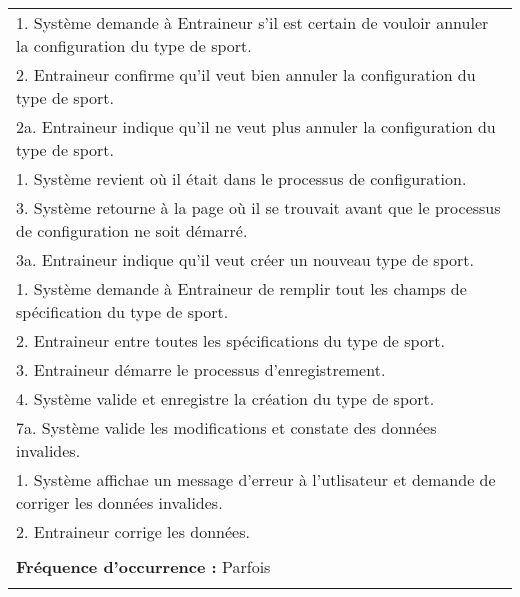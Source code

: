 \begin{tabular}{|p{16cm}|}
	\hspace{1cm}1. Système demande à Entraineur s'il est certain de vouloir annuler la configuration du type de sport.\\
	\hspace{1cm}2. Entraineur confirme qu'il veut bien annuler la configuration du type de sport.\\
	\hspace{2cm}2a. Entraineur indique qu'il ne veut plus annuler la configuration du type de sport.\\
	\hspace{3cm}1. Système revient où il était dans le processus de configuration.\\
	\hspace{1cm}3. Système retourne à la page où il se trouvait avant que le processus de configuration ne soit démarré.\\
	3a. Entraineur indique qu'il veut créer un nouveau type de sport.\\
	\hspace{1cm}1. Système demande à Entraineur de remplir tout les champs de spécification du type de sport.\\
	\hspace{1cm}2. Entraineur entre toutes les spécifications du type de sport.\\
	\hspace{1cm}3. Entraineur démarre le processus d'enregistrement.\\
	\hspace{1cm}4. Système valide et enregistre la création du type de sport.\\
	7a. Système valide les modifications et constate des données invalides.\\
	\hspace{1cm}1. Système affichae un message d'erreur à l'utlisateur et demande de corriger les données invalides.\\
	\hspace{1cm}2. Entraineur corrige les données.\\
	\\
	\textbf{Fréquence d'occurrence :} Parfois\\
	\\
	\hline
\end{tabular}

